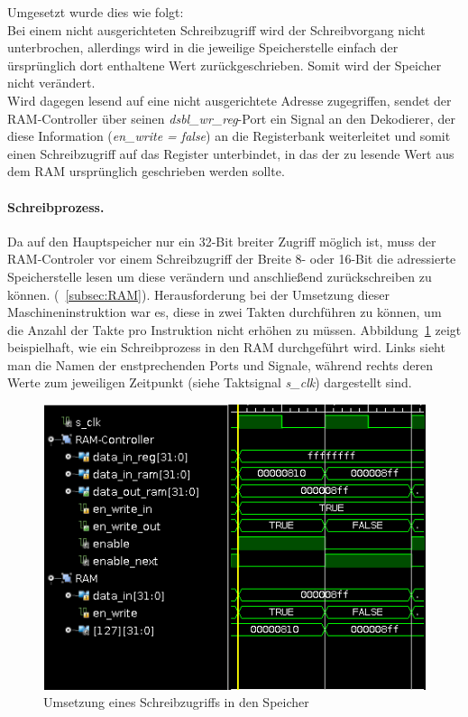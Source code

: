 Umgesetzt wurde dies wie folgt:\\
Bei einem nicht ausgerichteten Schreibzugriff wird der Schreibvorgang nicht unterbrochen, allerdings wird in die jeweilige Speicherstelle einfach der ürsprünglich dort enthaltene Wert zurückgeschrieben.
Somit wird der Speicher nicht verändert.\\
Wird dagegen lesend auf eine nicht ausgerichtete Adresse zugegriffen, sendet der RAM-Controller über seinen \textit{dsbl\_wr\_reg}-Port ein Signal an den Dekodierer, der diese Information (\textit{en\_write = false}) an die Registerbank weiterleitet und somit einen Schreibzugriff auf das Register unterbindet, in das der zu lesende Wert aus dem RAM ursprünglich geschrieben werden sollte.

\paragraph{Schreibprozess.} 
Da auf den Hauptspeicher nur ein 32-Bit breiter Zugriff möglich ist, muss der RAM-Controler vor einem Schreibzugriff der Breite 8- oder 16-Bit die adressierte Speicherstelle lesen um diese verändern und anschließend zurückschreiben zu können. (~\ref{subsec:RAM}).
Herausforderung bei der Umsetzung dieser Maschineninstruktion war es, diese in zwei Takten durchführen zu können, um die Anzahl der Takte pro Instruktion nicht erhöhen zu müssen.
Abbildung~\ref{fig:write} zeigt beispielhaft, wie ein Schreibprozess in den RAM durchgeführt wird.
Links sieht man die Namen der enstprechenden Ports und Signale, während rechts deren Werte zum jeweiligen Zeitpunkt (siehe Taktsignal \textit{s\_clk}) dargestellt sind.

\begin{figure}[htpb]
    \includegraphics[width=\textwidth]{Figures/write.png}
    \caption{Umsetzung eines Schreibzugriffs in den Speicher}
    \label{fig:write}
\end{figure}

